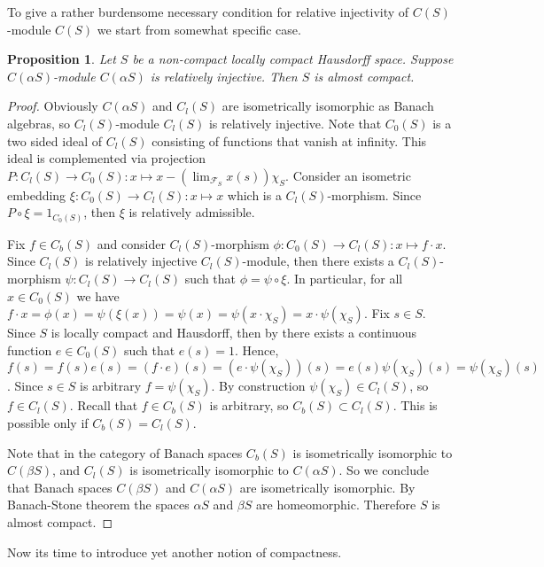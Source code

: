 \documentclass[12pt]{article}
\newtheorem{proposition}[theorem]{Proposition}
\begin{document}
To give a rather burdensome necessary condition for relative injectivity of $C(S)$-module $C(S)$ we start from somewhat specific case.

\begin{proposition}\label{RelInjCaSModCaSImplSAlmComp} Let $S$ be a non-compact locally compact Hausdorff space. Suppose $C(\alpha S)$-module $C(\alpha S)$ is relatively injective. Then $S$ is almost compact.
\end{proposition}
\begin{proof} Obviously $C(\alpha S)$ and $C_l(S)$ are isometrically isomorphic as Banach algebras, so $C_l(S)$-module $C_l(S)$ is relatively injective. Note that $C_0(S)$ is a two sided ideal of $C_l(S)$ consisting of functions that vanish at infinity. This ideal is complemented via projection $P:C_l(S)\to C_0(S):x\mapsto x-(\lim_{\mathcal{F}_S}x(s))\chi_{S}$. Consider an isometric embedding $\xi:C_0(S)\to C_l(S):x\mapsto x$ which is a $C_l(S)$-morphism. Since $P\circ\xi=1_{C_0(S)}$, then $\xi$ is relatively admissible.

    Fix $f \in C_b(S)$ and consider $C_l(S)$-morphism $\phi:C_0(S)\to C_l(S):x\mapsto f \cdot x$. Since $C_l(S)$ is relatively injective $C_l(S)$-module, then there exists a $C_l(S)$-morphism $\psi:C_l(S)\to C_l(S)$ such that $\phi=\psi\circ\xi$. In particular, for all $x\in C_0(S)$ we have $f\cdot x=\phi(x)=\psi(\xi(x))=\psi(x)=\psi(x\cdot \chi_{S})=x\cdot \psi(\chi_{S})$. Fix $s\in S$. Since $S$ is locally compact and Hausdorff, then by \cite[corollary 3.3.3]{EngkingGenTop} there exists a continuous function $e\in C_0(S)$ such that $e(s)=1$. Hence, $f(s)=f(s)e(s)=(f\cdot e)(s)=(e\cdot\psi(\chi_{S}))(s)=e(s)\psi(\chi_{S})(s)=\psi(\chi_{S})(s)$. Since $s\in S$ is arbitrary $f=\psi(\chi_{S})$. By construction $\psi(\chi_S)\in C_l(S)$, so $f\in C_l(S)$. Recall that $f\in C_b(S)$ is arbitrary, so $C_b(S)\subset C_l(S)$. This is possible only if $C_b(S)=C_l(S)$.

    Note that in the category of Banach spaces $C_b(S)$ is isometrically isomorphic to $C(\beta S)$, and $C_l(S)$ is isometrically isomorphic to $C(\alpha S)$. So we conclude that Banach spaces $C(\beta S)$ and $C(\alpha S)$ are isometrically isomorphic. By Banach-Stone theorem \cite[theorem 83]{StoneBanStAppBoolRngToTop} the spaces $\alpha S$ and $\beta S$ are homeomorphic. Therefore $S$ is almost compact.
\end{proof}

Now its time to introduce yet another notion of compactness.
\end{document}
